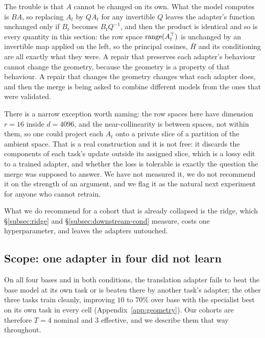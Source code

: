 The trouble is that $A$ cannot be changed on its own. What the model computes
is $BA$, so replacing $A_t$ by $Q A_t$ for any invertible $Q$ leaves the
adapter's function unchanged only if $B_t$ becomes $B_t Q^{-1}$, and then the
product is identical and so is every quantity in this section: the row space
$\operatorname{range}(A_t^\top)$ is unchanged by an invertible map applied on the left, so
the principal cosines, $\bar H$ and its conditioning are all exactly what they
were. A repair that preserves each adapter's behaviour cannot change the
geometry, because the geometry is a property of that behaviour. A repair that
changes the geometry changes what each adapter does, and then the merge is
being asked to combine different models from the ones that were validated.

There is a narrow exception worth naming: the row spaces here have dimension
$r = 16$ inside $d = 4096$, and the near-collinearity is between spaces, not
within them, so one could project each $A_t$ onto a private slice of a
partition of the ambient space. That is a real construction and it is not free:
it discards the components of each task's update outside its assigned slice,
which is a lossy edit to a trained adapter, and whether the loss is tolerable
is exactly the question the merge was supposed to answer. We have not measured
it, we do not recommend it on the strength of an argument, and we flag it as
the natural next experiment for anyone who cannot retrain.

What we do recommend for a cohort that is already collapsed is the ridge, which
\S\ref{subsec:ridge} and \S\ref{subsec:downstream-cond} measure, costs one
hyperparameter, and leaves the adapters untouched.

\subsection{Scope: one adapter in four did not learn}
\label{subsec:scope}

On all four bases and in both conditions, the translation adapter fails to
beat the base model at its own task or is beaten there by another task's
adapter; the other three tasks train cleanly, improving $10$ to $70\%$ over
base with the specialist best on its own task in every cell
(Appendix~\ref{app:geometry}). Our cohorts are therefore $T=4$ nominal and
$3$ effective, and we describe them that way throughout.

